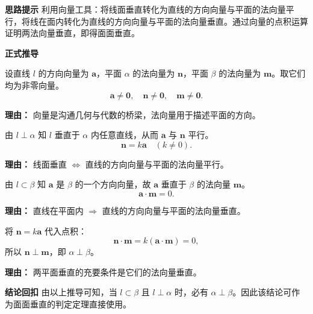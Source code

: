 \begin{proofbox}
	\textbf{\textcolor{CProof}{思路提示}}
	利用向量工具：将线面垂直转化为直线的方向向量与平面的法向量平行，将线在面内转化为直线的方向向量与平面的法向量垂直。通过向量的点积运算证明两法向量垂直，即得面面垂直。

	\medskip
	\textbf{\textcolor{CProof}{正式推导}}
	\begin{description}[style=nextline, leftmargin=2.8em, labelsep=0.5em, itemsep=0.55em]
		\item[\textbf{步骤一（向量设定）：}]
			设直线 $l$ 的方向向量为 $\boldsymbol{a}$，平面 $\alpha$ 的法向量为 $\boldsymbol{n}$，平面 $\beta$ 的法向量为 $\boldsymbol{m}$。取它们均为非零向量。
			\[
				\boldsymbol{a}\neq\mathbf{0},\quad\boldsymbol{n}\neq\mathbf{0},\quad\boldsymbol{m}\neq\mathbf{0}.
			\]
			\par\textbf{理由：} 向量是沟通几何与代数的桥梁，法向量用于描述平面的方向。
		\item[\textbf{步骤二（线面垂直得平行）：}]
			由 $l\perp\alpha$ 知 $l$ 垂直于 $\alpha$ 内任意直线，从而 $\boldsymbol{a}$ 与 $\boldsymbol{n}$ 平行。
			\[
				\boldsymbol{n}=k\boldsymbol{a}\quad(k\neq0).
			\]
			\par\textbf{理由：} 线面垂直 $\Leftrightarrow$ 直线的方向向量与平面的法向量平行。
		\item[\textbf{步骤三（线在面内得垂直）：}]
			由 $l\subset\beta$ 知 $\boldsymbol{a}$ 是 $\beta$ 的一个方向向量，故 $\boldsymbol{a}$ 垂直于 $\beta$ 的法向量 $\boldsymbol{m}$。
			\[
				\boldsymbol{a}\cdot\boldsymbol{m}=0.
			\]
			\par\textbf{理由：} 直线在平面内 $\Rightarrow$ 直线的方向向量与平面的法向量垂直。
		\item[\textbf{步骤四（法向量垂直）：}]
			将 $\boldsymbol{n}=k\boldsymbol{a}$ 代入点积：
			\[
				\boldsymbol{n}\cdot\boldsymbol{m}=k(\boldsymbol{a}\cdot\boldsymbol{m})=0,
			\]
			所以 $\boldsymbol{n}\perp\boldsymbol{m}$，即 $\alpha\perp\beta$。
			\par\textbf{理由：} 两平面垂直的充要条件是它们的法向量垂直。
	\end{description}

	\medskip
	\textbf{\textcolor{CProof}{结论回扣}}
	由以上推导可知，当 $l\subset\beta$ 且 $l\perp\alpha$ 时，必有 $\alpha\perp\beta$。因此该结论可作为面面垂直的判定定理直接使用。
\end{proofbox}
